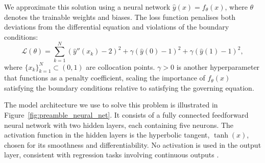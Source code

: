 We approximate this solution using a neural network \( \hat{y}(x) = f_\theta(x) \), where 
\( \theta \) denotes the trainable weights and biases. The loss function penalises both 
deviations from the differential equation and violations of the boundary conditions:
\begin{equation}
\label{eq:prelim_loss_func}
\mathcal{L}(\theta) = \sum_{k=1}^N \left( \hat{y}''(x_k) - 2 \right)^2 
+ \gamma \left( \hat{y}(0) - 1 \right)^2 
+ \gamma \left( \hat{y}(1) - 1 \right)^2,
\end{equation}
where \( \{x_k\}_{k=1}^N \subset (0,1) \) are collocation points. \( \gamma > 0 \) is another 
hyperparameter that functions as a penalty coefficient, scaling the importance of $f_\theta(x)$
satisfying the boundary conditions relative to satisfying the governing equation.

The model architecture we use to solve this problem is illustrated in 
Figure~\ref{fig:preamble_neural_net}. It consists of a 
fully connected feedforward neural network with two hidden layers, each containing five neurons. 
The activation function in the hidden layers is the hyperbolic tangent, \( \tanh(x) \), chosen for 
its smoothness and differentiability. No activation is used in the output layer, consistent 
with regression tasks involving continuous outputs \cite{goodfellow2016deep}.


